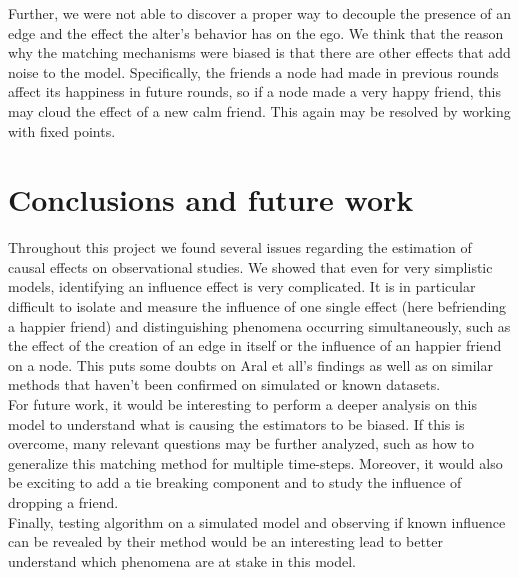 \documentclass[11pt]{article}
\begin{document}
Further, we were not able to discover a proper way to decouple the presence of an edge and the effect the alter's behavior has on the ego. We think that the reason why the matching mechanisms were biased is that there are other effects that add noise to the model. Specifically, the friends a node had made in previous rounds affect its happiness in future rounds, so if a node made a very happy friend, this may cloud the effect of a new calm friend. This again may be resolved by working with fixed points.
\FloatBarrier


\section{Conclusions and future work}
Throughout this project we found several issues regarding the estimation of causal effects on observational studies. We showed that even for very simplistic models, identifying an influence effect is very complicated. It is in particular difficult to isolate and measure the influence of one single effect (here befriending a happier friend) and distinguishing phenomena occurring simultaneously, such as the effect of the creation of an edge in itself or the influence of an happier friend on a node. This puts some doubts on Aral et all’s findings as well as on similar methods that haven’t been confirmed on simulated or known datasets. \\

For future work, it would be interesting to perform a deeper analysis on this model to understand what is causing the estimators to be biased. If this is overcome, many relevant questions may be further analyzed, such as how to generalize this matching method for multiple time-steps. Moreover, it would also be exciting to add a tie breaking component and to study the influence of dropping a friend.\\

Finally, testing \citep{aral2009distinguishing} algorithm on a simulated model and observing if known influence can be revealed by their method would be an interesting lead to better understand which phenomena are at stake in this model.
	

\newpage


\nocite{*}
\end{document}
